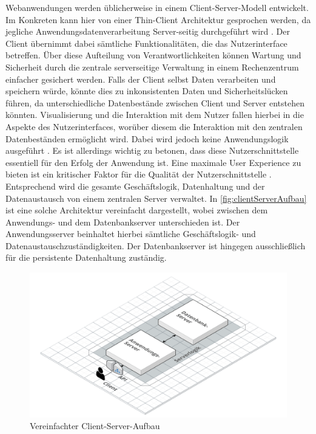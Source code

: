 Webanwendungen werden üblicherweise in einem Client-Server-Modell entwickelt. Im Konkreten kann hier von einer Thin-Client Architektur gesprochen werden, da jegliche Anwendungsdatenverarbeitung Server-seitig durchgeführt wird \autocite{definitionOfThinClient}. %
Der Client übernimmt dabei sämtliche Funktionalitäten, die das Nutzerinterface betreffen. Über diese Aufteilung von Verantwortlichkeiten können Wartung und Sicherheit durch die zentrale serverseitige Verwaltung in einem Rechenzentrum einfacher gesichert werden. Falls der Client selbst Daten verarbeiten und speichern würde, könnte dies zu inkonsistenten Daten und Sicherheitslücken führen, da unterschiedliche Datenbestände zwischen Client und Server entstehen könnten. 
Visualisierung und die Interaktion mit dem Nutzer fallen hierbei in die Aspekte des Nutzerinterfaces, worüber diesem die Interaktion mit den zentralen Datenbeständen ermöglicht wird. Dabei wird jedoch keine Anwendungslogik ausgeführt \autocite{thinClientArchitectureOverview}. Es ist allerdings wichtig zu betonen, dass diese Nutzerschnittstelle essentiell für den Erfolg der Anwendung ist. Eine maximale User Experience \autocite{definitionUserExperience} zu bieten ist ein kritischer Faktor für die Qualität der Nutzerschnittstelle \autocite{thinClientArchitectureOverview}.\\
Entsprechend wird die gesamte Geschäftslogik, Datenhaltung und der Datenaustausch von einem zentralen Server verwaltet. 
In \autoref{fig:clientServerAufbau} ist eine solche Architektur vereinfacht dargestellt, wobei zwischen dem Anwendungs- und dem Datenbankserver unterschieden ist. Der Anwendungsserver beinhaltet hierbei sämtliche Geschäftslogik- und Datenaustauschzuständigkeiten. Der Datenbankserver ist hingegen ausschließlich für die persistente Datenhaltung zuständig.

\begin{figure}[h]
    \centering
    \includegraphics[width=.9\textwidth]{img/ClientServer.png}
    \caption{Vereinfachter Client-Server-Aufbau}
    \label{fig:clientServerAufbau}
\end{figure}

